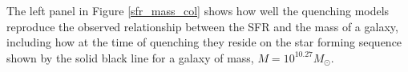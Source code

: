 \documentclass[useAMS,usenatbib]{mn2e}
\def\starfpy {\textsc{StarfPy}}
\begin{document}

The left panel in Figure \ref{sfr_mass_col} shows how well the quenching models reproduce the observed relationship between the SFR and the mass of a galaxy, including how at the time of quenching they reside on the star forming sequence shown by the solid black line for a galaxy of mass, $M = 10^{10.27} M_{\odot}$.  %

\end{document}
